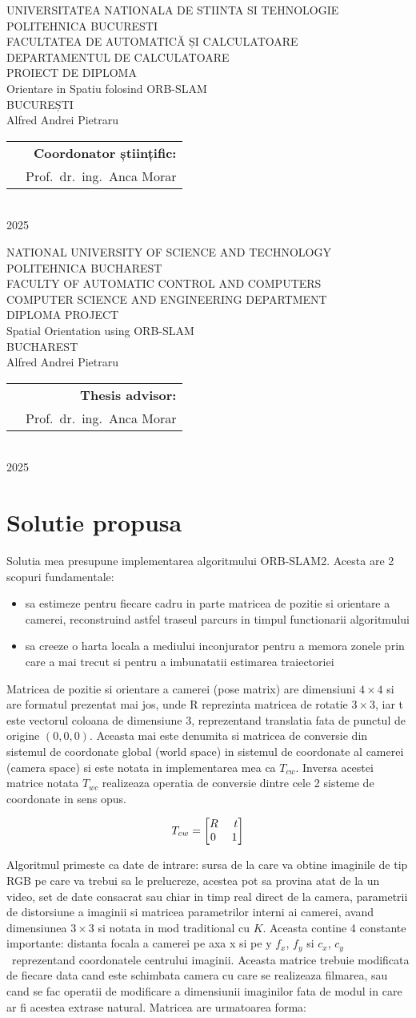 \documentclass[12pt,a4paper]{report}
\makeatletter
\newcommand{\HeaderLineSpace}{-0.25cm}
\newcommand{\UniTextRO}{UNIVERSITATEA NATIONALA DE STIINTA SI TEHNOLOGIE POLITEHNICA BUCURESTI \\[\HeaderLineSpace] 
FACULTATEA DE AUTOMATICĂ ȘI CALCULATOARE \\[\HeaderLineSpace]
DEPARTAMENTUL DE CALCULATOARE\\}
\newcommand{\DiplomaRO}{PROIECT DE DIPLOMA}
\newcommand{\AdvisorRO}{Coordonator științific:}
\newcommand{\BucRO}{BUCUREȘTI}
\newcommand{\UniTextEN}{NATIONAL UNIVERSITY OF SCIENCE AND TECHNOLOGY POLITEHNICA BUCHAREST \\[\HeaderLineSpace]
FACULTY OF AUTOMATIC CONTROL AND COMPUTERS \\[\HeaderLineSpace]
COMPUTER SCIENCE AND ENGINEERING DEPARTMENT\\}
\newcommand{\DiplomaEN}{DIPLOMA PROJECT}
\newcommand{\AdvisorEN}{Thesis advisor:}
\newcommand{\BucEN}{BUCHAREST}
\newcommand{\ProjectTitleRO}{Orientare in Spatiu folosind ORB-SLAM}
\newcommand{\ProjectTitleEN}{Spatial Orientation using ORB-SLAM}
\newcommand{\frontPage}[6]{
\begin{titlepage}
\begin{center}
{\Large #1}  %
\vspace{50pt}
\vspace{105pt}
{\Huge #2}\\                           %
\vspace{40pt}
{\Large #3}\\ \vspace{0pt}  %
{\Large #4}\\                          %
\vspace{40pt}
{\LARGE Alfred Andrei Pietraru}\\                   %
\end{center}
\vspace{60pt}
\begin{tabular*}{\textwidth}{@{\extracolsep{\fill}}p{6cm}r}
&{\large\textbf{#5}}\vspace{10pt}\\      %
&{\large Prof.\ dr.\ ing.\ Anca Morar}                                    %
\end{tabular*}
\vspace{20pt}
\begin{center}
{\large\textbf{#6}}\\                                %
\vspace{0pt}
{\normalsize 2025}
\end{center}
\end{titlepage}
}
\newcommand{\frontPageRO}{\frontPage{\UniTextRO}{\DiplomaRO}{\ProjectTitleRO}{\BucRO}{\AdvisorRO}}
\newcommand{\frontPageEN}{\frontPage{\UniTextEN}{\DiplomaEN}{\ProjectTitleEN}{\BucEN}{\AdvisorEN}}
\makeatother
\begin{document}
\frontPageRO{}
\frontPageEN{}
\AbstractPage{}
\chapter{Solutie propusa}
Solutia mea presupune implementarea algoritmului ORB-SLAM2. Acesta are 2 scopuri 
fundamentale:
\begin{itemize}
    \item sa estimeze pentru fiecare cadru in parte matricea de pozitie si orientare
a camerei, reconstruind astfel traseul parcurs in timpul functionarii algoritmului  
    \item sa creeze o harta locala a mediului inconjurator pentru a memora zonele
prin care a mai trecut si pentru a imbunatatii estimarea traiectoriei  
\end{itemize}
Matricea de pozitie si orientare a camerei (pose matrix) are dimensiuni $ 4 \times 4 $ si are 
formatul prezentat mai jos, unde R reprezinta matricea de rotatie $ 3 \times 3 $, iar t este
vectorul coloana de dimensiune 3, reprezentand translatia fata de punctul de origine
\( (0, 0, 0)\). Aceasta mai este denumita si matricea de conversie din sistemul de 
coordonate global (world space) in sistemul de coordonate al camerei (camera space) si 
este notata in implementarea mea ca \( T_{cw} \). Inversa acestei matrice notata
\(T_{wc} \) realizeaza operatia de conversie dintre cele 2 sisteme de coordonate 
in sens opus.

\begin{equation}
T_{cw} = 
\begin{bmatrix}
R \hspace{0.5cm} t \\
0 \hspace{0.5cm} 1
\end{bmatrix}
\end{equation}

Algoritmul primeste ca date de intrare: sursa de la care va obtine imaginile de tip
RGB pe care va trebui sa le prelucreze, acestea pot sa provina atat de la un video,
set de date consacrat sau chiar in timp real direct de la camera, parametrii de 
distorsiune a imaginii si matricea parametrilor interni ai camerei, avand dimensiunea 
$ 3 \times 3 $ si notata in mod traditional cu \(K\). Aceasta contine 4 constante importante: 
distanta focala a camerei pe axa x si pe y \(f_x\), \(f_y\) si \(c_x\), \(c_y\) \
reprezentand coordonatele centrului imaginii. Aceasta matrice trebuie modificata de 
fiecare data cand este schimbata camera cu care se realizeaza filmarea, sau cand se 
fac operatii de modificare a dimensiunii imaginilor fata de modul in care ar fi 
acestea extrase natural. Matricea are urmatoarea forma:
   
\end{document}
